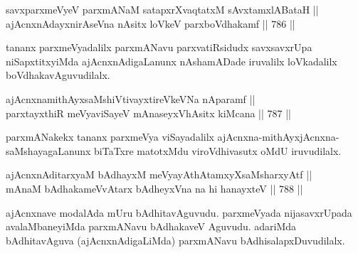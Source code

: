 
\begin{shl}
savxparxmeVyeV parxmANaM satapxrXvaqtatxM sAvxtamxlABataH || \\
ajAcnxnAdayxnirAseVna nAsitx loVkeV parxboVdhakamf \hfill || 786 ||  
\end{shl}

\begin{artha} 
tananx parxmeVyadalilx parxmANavu parxvatiRsidudx savxsavxrUpa niSapxtitxyiMda ajAcnxnAdigaLanunx nAshamADade iruvalilx loVkadalilx boVdhakavAguvudilalx.
\end{artha}


\begin{shl}
ajAcnxnamithAyxsaMshiVtivayxtireVkeVNa nAparamf || \\
parxtayxthiR meVyaviSayeV mAnaseyxVhAsitx kiMcana \hfill || 787 ||  
\end{shl}

\begin{artha} 
parxmANakekx tananx parxmeVya viSayadalilx ajAcnxna-mithAyxjAcnxna-saMshayagaLanunx biTaTxre matotxMdu viroVdhivasutx oMdU iruvudilalx.
\end{artha}


\begin{shl}
ajAcnxnAditarxyaM bAdhayxM meVyayAthAtamxyXsaMsharxyAtf || \\
mAnaM bAdhakameVvAtarx bAdheyxVna na hi hanayxteV \hfill || 788 ||  
\end{shl}

\begin{artha} 
ajAcnxnave modalAda mUru bAdhitavAguvudu. parxmeVyada nijasavxrUpada avalaMbaneyiMda parxmANavu bAdhakaveV Aguvudu. adariMda bAdhitavAguva (ajAcnxnAdigaLiMda) parxmANavu bAdhisalapxDuvudilalx.
\end{artha}
